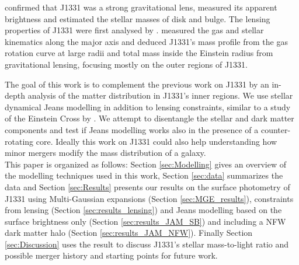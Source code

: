 \citet{SWELLSI} confirmed that J1331 was a strong gravitational lens, measured its apparent brightness and estimated the stellar masses of disk and bulge. The lensing properties of J1331 were first analysed by \citet{SWELLSIII}. \citet{SWELLSV} measured the gas and stellar kinematics along the major axis and deduced J1331's mass profile from the gas rotation curve at large radii and total mass inside the Einstein radius from gravitational lensing, focusing mostly on the outer regions of J1331.

The goal of this work is to complement the previous work on J1331 by an in-depth analysis of the matter distribution in J1331's inner regions. We use stellar dynamical Jeans modelling in addition to lensing constraints, similar to a study of the Einstein Cross by \citet{GlennEC}. We attempt to disentangle the stellar and dark matter components and test if Jeans modelling works also in the presence of a counter-rotating core. Ideally this work on J1331 could also help understanding how minor mergers modify the mass distribution of a galaxy.\\

This paper is organized as follows: Section \ref{sec:Modelling} gives an overview of the modelling techniques used in this work, Section \ref{sec:data} summarizes the data and Section \ref{sec:Results} presents our results on the surface photometry of J1331 using Multi-Gaussian expansions (Section \ref{sec:MGE_results}), constraints from lensing (Section \ref{sec:results_lensing}) and Jeans modelling based on the surface brightness only (Section \ref{sec:results_JAM_SB}) and including a NFW dark matter halo (Section \ref{sec:results_JAM_NFW}). Finally Section \ref{sec:Discussion} uses the result to discuss J1331's stellar mass-to-light ratio and possible merger history and starting points for future work.



